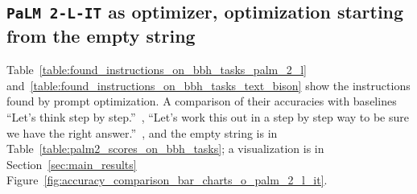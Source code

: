 \subsection{\texttt{PaLM 2-L-IT} as optimizer, optimization starting from the empty string}
\label{appsec:bbh_taskwise_detailed_results_palm_2_l_it_optimizer}
Table~\ref{table:found_instructions_on_bbh_tasks_palm_2_l} and~\ref{table:found_instructions_on_bbh_tasks_text_bison} show the instructions found by prompt optimization.
A comparison of their accuracies with baselines ``Let's think step by step.''~\citep{kojima2022large}, ``Let’s work this out in a step by step way to be sure we have the right answer.''~\citep{zhou2022large}, and the empty string is in Table~\ref{table:palm2_scores_on_bbh_tasks}; a visualization is in Section~\ref{sec:main_results} Figure~\ref{fig:accuracy_comparison_bar_charts_o_palm_2_l_it}.


